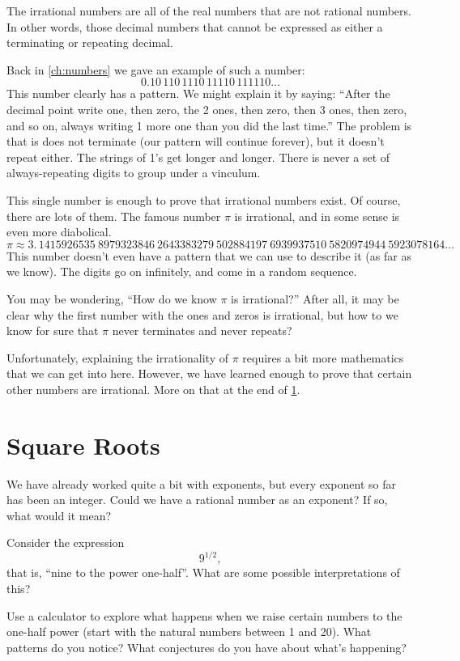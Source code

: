 The \glspl{irrational number} are all of the real numbers that are not rational numbers. In other words, those decimal numbers that cannot be expressed as either a terminating or repeating decimal.

Back in \cref{ch:numbers} we gave an example of such a number: \[0.10\,110\,1110\,11110\,111110\ldots\]
This number clearly has a pattern. We might explain it by saying: ``After the decimal point write one, then zero, the 2 ones, then zero, then 3 ones, then zero, and so on, always writing 1 more one than you did the last time.'' The problem is that is does not terminate (our pattern will continue forever), but it doesn't repeat either. The strings of 1's get longer and longer. There is never a set of always-repeating digits to group under a vinculum.

This single number is enough to prove that irrational numbers exist. Of course, there are lots of them. The famous number $\pi$ is irrational, and in some sense is even more diabolical.
\[\pi \approx 3. \, 1415926535 ~ 8979323846 ~ 2643383279 ~ 502884197 ~ 6939937510 ~ 5820974944 ~ 5923078164\ldots\]
This number doesn't even have a pattern that we can use to describe it (as far as we know). The digits go on infinitely, and come in a random sequence.

You may be wondering, ``How do we know $\pi$ is irrational?'' After all, it may be clear why the first number with the ones and zeros is irrational, but how to we know for sure that $\pi$ never terminates and never repeats?

Unfortunately, explaining the irrationality of $\pi$ requires a bit more mathematics that we can get into here. However, we have learned enough to prove that certain other numbers are irrational. More on that at the end of \cref{sec:radsquareroots}.

\section{Square Roots}
\label{sec:radsquareroots}

We have already worked quite a bit with exponents, but every exponent so far has been an integer. Could we have a rational number as an exponent? If so, what would it mean?

\begin{boxedexplore}
Consider the expression \[9^{1/2},\] that is, ``nine to the power one-half''. What are some possible interpretations of this?

Use a calculator to explore what happens when we raise certain numbers to the one-half power (start with the natural numbers between 1 and 20). What patterns do you notice? What conjectures do you have about what's happening?
\end{boxedexplore}

